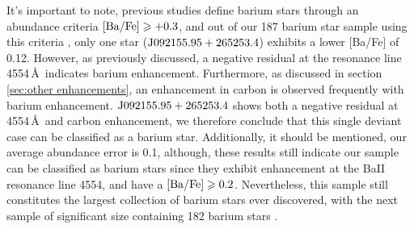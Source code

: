 \documentclass[a4paper,fleqn,usenatbib]{mnras}
\begin{document}
It's important to note, previous studies \citet{malaney1988} define barium stars through an abundance criteria $\rm[Ba/Fe]\geq +0.3$, and out of our 187 barium star sample using this criteria , only one star ($\rm J092155.95+265253.4$) exhibits a lower [Ba/Fe] of 0.12. However, as previously discussed, a negative residual at the  resonance line 4554\,\AA\, indicates barium enhancement. Furthermore, as discussed in section \ref{sec:other enhancements}, an enhancement in carbon is observed frequently with barium enhancement. $\rm J092155.95+265253.4$ shows both a negative residual at 4554\,\AA\, and carbon enhancement, we therefore conclude that this single deviant case can be classified as a barium star. Additionally, it should be mentioned, our average abundance error is 0.1, although, these results still indicate our sample can be classified as barium stars since they exhibit enhancement at the BaII resonance line 4554, and have a $\rm[Ba/Fe] \geq 0.2$. Nevertheless, this sample still constitutes the largest collection of barium stars ever discovered, with the next sample of significant size containing 182 barium stars \citep[e.g.,][]{decastro2016}.
\end{document}
